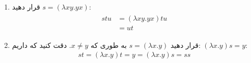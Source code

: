 \begin{enumerate}[label= \textbf{(\textit{\alph*})}]
    \item
        قرار دهید $s = (\lambda xy . yx)$:
        \begin{gather*}
            \begin{split}
                stu & = (\lambda xy. yx) tu \\
                    & = ut 
            \end{split}
        \end{gather*}
    \item 
        قرار دهید $s = (\lambda x. y)$ به طوری که $x \ne y$. دقت کنید که داریم: $(\lambda x.y) s = y$:
        \begin{gather*}
                st  = (\lambda x. y) t  = y = (\lambda x. y) s = ss 
        \end{gather*}
\end{enumerate}